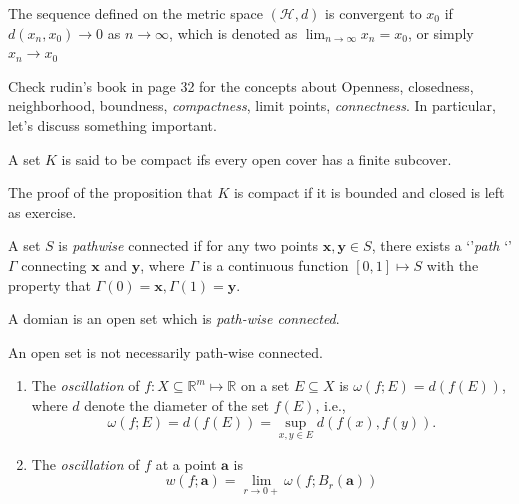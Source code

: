 \begin{definition}[Convergence]
The sequence defined on the metric space $(\mathcal{H},d)$ is convergent to $x_0$ if $d(x_n,x_0)\to0$ as $n\to\infty$, which is denoted as $\lim_{n\to\infty}x_n=x_0$, or simply $x_n\to x_0$
\end{definition}
Check rudin's book in page 32 for the concepts about Openness, closedness, neighborhood, boundness, \emph{compactness}, limit points, \emph{connectness}. In particular, let's discuss something important.
\begin{definition}[Compact]
A set $K$ is said to be compact ifs every open cover has a finite subcover.
\end{definition}
The proof of the proposition that $K$ is compact if it is bounded and closed is left as exercise.
\begin{definition}
A set $S$ is \emph{pathwise} connected if for any two points $\bm x,\bm y\in S$, there exists a `'\emph{path}
`' $\Gamma$ connecting $\bm x$ and $\bm y$, where $\Gamma$ is a continuous function $[0,1]\mapsto S$ with the property that $\Gamma(0)=\bm x,\Gamma(1)=\bm y$. 
\end{definition}
\begin{definition}[Domain]
A domian is an open set which is \emph{path-wise connected}.
\end{definition}
\begin{remark}
An open set is not necessarily path-wise connected.
\end{remark}
\begin{definition}[Oscillation]
\begin{enumerate}
\item
The \emph{oscillation} of $f:X\subseteq\mathbb{R}^m\mapsto\mathbb{R}$ on a set $E\subseteq X$ is $\omega(f;E)=d(f(E))$, where $d$ denote the diameter of the set $f(E)$, i.e.,
\[
\omega(f;E)=d(f(E))=\sup_{x,y\in E}d(f(x),f(y)).
\]
\item
The \emph{oscillation} of $f$ at a point $\bm a$ is
\[
w(f;\bm a)=\lim_{r\to0+}\omega(f;B_{r}(\bm a))
\]
\end{enumerate}
\end{definition}
